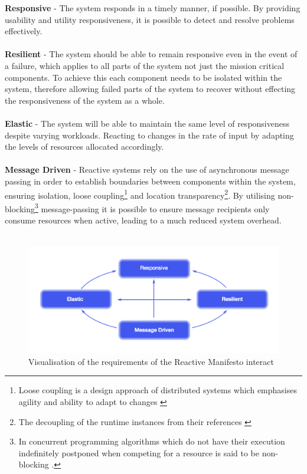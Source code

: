 \documentclass[a4paper, 11pt]{article}
\begin{document}
\textbf{Responsive} - The system responds in a timely manner, if possible. By providing usability and utility responsiveness, it is possible to detect and resolve problems effectively.\\\\
\textbf{Resilient} - The system should be able to remain responsive even in the event of a failure, which applies to all parts of the system not just the mission critical components. To achieve this each component needs to be isolated within the system, therefore allowing failed parts of the system to recover without effecting the responsiveness of the system as a whole.\\\\
\textbf{Elastic} - The system will be able to maintain the same level of responsiveness despite varying workloads. Reacting to changes in the rate of input by adapting the levels of resources allocated accordingly.\\\\
\textbf{Message Driven} - Reactive systems rely on the use of asynchronous message passing in order to establish boundaries between components within the system, ensuring isolation, loose coupling\footnote{Loose coupling is a design approach of distributed systems which emphasises agility and ability to adapt to changes \cite{looseCouple}} and location transparency\footnote{The decoupling of the runtime instances from their references \cite{reactMan}}. By utilising non-blocking\footnote{In concurrent programming algorithms which do not have their execution indefinitely postponed when competing for a resource is said to be non-blocking \cite{reactMan}.} message-passing it is possible to ensure message recipients only consume resources when active, leading to a much reduced system overhead.\\\\

\begin{figure}[ht]
	\centering
	\includegraphics[scale=0.25]{images/reacManif.jpg}
	\caption{Visualisation of the requirements of the Reactive Manifesto interact \cite{reactMan}}
	\label{fig: reacMan}
\end{figure}
\end{document}
